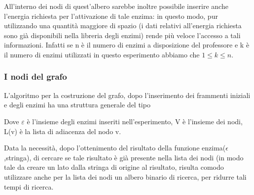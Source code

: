 \documentclass[a4paper,10pt]{article}
\begin{document}
All'interno dei nodi di quest'albero sarebbe inoltre possibile inserire anche l'energia richiesta per l'attivazione di tale enzima: in questo modo, pur utilizzando una quantità maggiore di spazio (i dati relativi all'energia richiesta sono già disponibili nella libreria degli enzimi) rende più veloce l'accesso a tali informazioni. Infatti se n è il numero di enzimi a disposizione del professore e k è il numero di enzimi utilizzati in questo esperimento abbiamo che $1\le k \le n$.

\subsubsection{I nodi del grafo}\label{sec:nodi}
L'algoritmo per la costruzione del grafo, dopo l'inserimento dei frammenti iniziali e degli enzimi ha una struttura generale del tipo

\begin{algorithm}[H]
\end{algorithm}
Dove $\varepsilon$ è l'insieme degli enzimi inseriti nell'esperimento, V è l'insieme dei nodi, L(v) è la lista di adiacenza del nodo v.

Data la necessità, dopo l'ottenimento del risultato della funzione enzima($\epsilon$,stringa), di cercare se tale risultato è già presente nella lista dei nodi (in modo tale da creare un lato dalla stringa di origine al risultato, risulta comodo utilizzare anche per la lista dei nodi un albero binario di ricerca, per ridurre tali tempi di ricerca.
\end{document}
